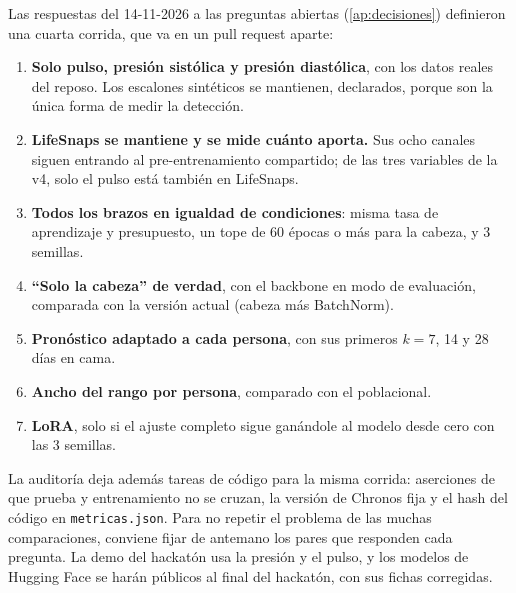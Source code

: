Las respuestas del 14-11-2026 a las preguntas abiertas (\cref{ap:decisiones}) definieron una cuarta corrida, que va en
un pull request aparte:
\begin{enumerate}
\item \textbf{Solo pulso, presión sistólica y presión diastólica}, con los datos reales del reposo. Los escalones
  sintéticos se mantienen, declarados, porque son la única forma de medir la detección.
\item \textbf{LifeSnaps se mantiene y se mide cuánto aporta.} Sus ocho canales siguen entrando al pre-entrenamiento
  compartido; de las tres variables de la v4, solo el pulso está también en LifeSnaps.
\item \textbf{Todos los brazos en igualdad de condiciones}: misma tasa de aprendizaje y presupuesto, un tope de 60
  épocas o más para la cabeza, y 3 semillas.
\item \textbf{\enquote{Solo la cabeza} de verdad}, con el backbone en modo de evaluación, comparada con la versión
  actual (cabeza más BatchNorm).
\item \textbf{Pronóstico adaptado a cada persona}, con sus primeros $k = 7$, 14 y 28 días en cama.
\item \textbf{Ancho del rango por persona}, comparado con el poblacional.
\item \textbf{LoRA}, solo si el ajuste completo sigue ganándole al modelo desde cero con las 3 semillas.
\end{enumerate}

La auditoría deja además tareas de código para la misma corrida: aserciones de que prueba y entrenamiento no se cruzan,
la versión de Chronos fija y el hash del código en \texttt{metricas.json}. Para no repetir el problema de las muchas
comparaciones, conviene fijar de antemano los pares que responden cada pregunta. La demo del hackatón usa la presión y
el pulso, y los modelos de Hugging Face se harán públicos al final del hackatón, con sus fichas corregidas.
